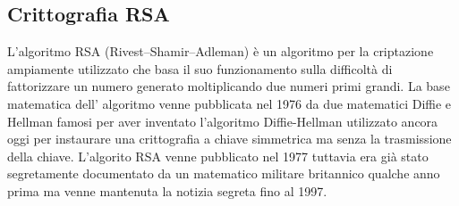 \begin{itemize}
\chapter{Crittografia RSA}
L'algoritmo RSA (Rivest–Shamir–Adleman) è un algoritmo per la criptazione ampiamente utilizzato che basa il suo funzionamento sulla difficoltà di fattorizzare un numero generato moltiplicando due numeri primi grandi. La base matematica dell' algoritmo venne pubblicata nel 1976 da due matematici Diffie e Hellman famosi per aver inventato l'algoritmo Diffie-Hellman utilizzato ancora oggi per instaurare una crittografia a chiave simmetrica ma senza la trasmissione della chiave. L'algorito RSA venne pubblicato nel 1977 tuttavia era già stato segretamente documentato da un matematico  militare britannico qualche anno prima ma venne mantenuta la notizia segreta fino al 1997.
 

\end{itemize}
